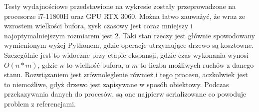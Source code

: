 Testy wydajnościowe przedstawione na wykresie zostały przeprowadzone na procesorze i7-11800H oraz GPU RTX 3060. Można łatwo zauważyć, że wraz ze wzrostem wielkości bufora, zysk czasowy jest coraz mniejszy i najoptymalniejszym rozmiarem jest 2. Taki stan rzeczy jest głównie spowodowany wymienionym wyżej Pythonem, gdzie operacje utrzymujące drzewo są kosztowne. Szczególnie jest to widoczne przy etapie ekspansji, gdzie czas wykonania wynosi $O(n * m)$, gdzie $n$ to wielkość bufora, a $m$ to liczba możliwych ruchów z danego stanu. Rozwiązaniem jest zrównoleglenie również i tego procesu, aczkolwiek jest to niemożliwe, gdyż drzewo jest zapisywane w sposób obiektowy. Podczas przekazywania danych do procesów, są one najpierw serializowane co powoduje problem z referencjami.
